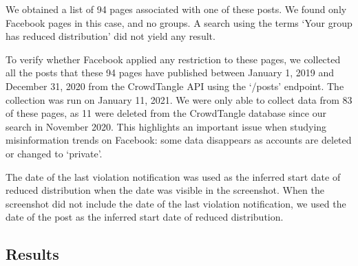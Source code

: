 \documentclass[11pt,a4paper]{article}
\begin{document}
We obtained a list of 94 pages associated with one of these posts. 
We found only Facebook pages in this case, and no groups. 
A search using the terms `Your group has reduced distribution' did not yield any result.

To verify whether Facebook applied any restriction to these pages, we collected all the posts that these 94 pages have published between January 1, 2019 and December 31, 2020 from the CrowdTangle API using the `/posts' endpoint. 
The collection was run on January 11, 2021.
We were only able to collect data from 83 of these pages, as 11 were deleted from the CrowdTangle database since our search in November 2020. 
This highlights an important issue when studying misinformation trends on Facebook: some data disappears as accounts are deleted or changed to ‘private’.

The date of the last violation notification was used as the inferred start date of reduced distribution when the date was visible in the screenshot. 
When the screenshot did not include the date of the last violation notification, we used the date of the post as the inferred start date of reduced distribution. 

\subsection{Results}
\end{document}
